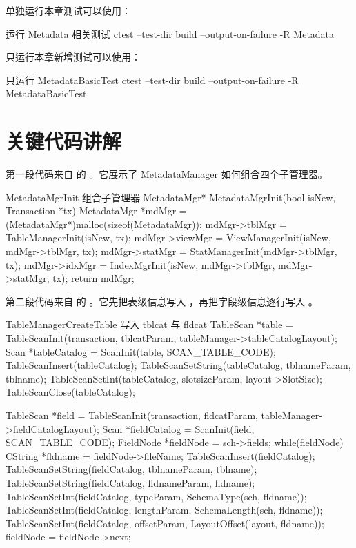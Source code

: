 单独运行本章测试可以使用：

\begin{dbcode}[listing options={language=bash}]{运行 Metadata 相关测试}
ctest --test-dir build --output-on-failure -R Metadata
\end{dbcode}

只运行本章新增测试可以使用：

\begin{dbcode}[listing options={language=bash}]{只运行 MetadataBasicTest}
ctest --test-dir build --output-on-failure -R MetadataBasicTest
\end{dbcode}

\section{关键代码讲解}
\label{sec:metadata-code}

第一段代码来自  的 。它展示了 MetadataManager 如何组合四个子管理器。

\begin{dbcode}{MetadataMgrInit 组合子管理器}
MetadataMgr* MetadataMgrInit(bool isNew, Transaction *tx) {
    MetadataMgr *mdMgr = (MetadataMgr*)malloc(sizeof(MetadataMgr));
    mdMgr->tblMgr = TableManagerInit(isNew, tx);
    mdMgr->viewMgr = ViewManagerInit(isNew, mdMgr->tblMgr, tx);
    mdMgr->statMgr = StatManagerInit(mdMgr->tblMgr, tx);
    mdMgr->idxMgr = IndexMgrInit(isNew, mdMgr->tblMgr, mdMgr->statMgr, tx);
    return mdMgr;
}
\end{dbcode}

第二段代码来自  的 。它先把表级信息写入 ，再把字段级信息逐行写入 。

\begin{dbcode}{TableManagerCreateTable 写入 tblcat 与 fldcat}
TableScan *table = TableScanInit(transaction, tblcatParam,
                                 tableManager->tableCatalogLayout);
Scan *tableCatalog = ScanInit(table, SCAN_TABLE_CODE);
TableScanInsert(tableCatalog);
TableScanSetString(tableCatalog, tblnameParam, tblname);
TableScanSetInt(tableCatalog, slotsizeParam, layout->SlotSize);
TableScanClose(tableCatalog);

TableScan *field = TableScanInit(transaction, fldcatParam,
                                 tableManager->fieldCatalogLayout);
Scan *fieldCatalog = ScanInit(field, SCAN_TABLE_CODE);
FieldNode *fieldNode = sch->fields;
while(fieldNode){
    CString *fldname = fieldNode->fileName;
    TableScanInsert(fieldCatalog);
    TableScanSetString(fieldCatalog, tblnameParam, tblname);
    TableScanSetString(fieldCatalog, fldnameParam, fldname);
    TableScanSetInt(fieldCatalog, typeParam, SchemaType(sch, fldname));
    TableScanSetInt(fieldCatalog, lengthParam, SchemaLength(sch, fldname));
    TableScanSetInt(fieldCatalog, offsetParam, LayoutOffset(layout, fldname));
    fieldNode = fieldNode->next;
}
\end{dbcode}

